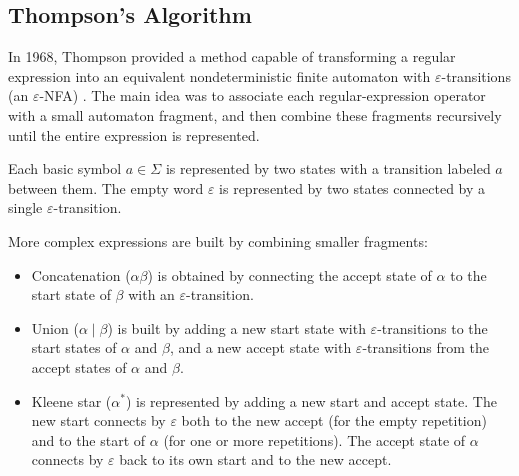 

\subsection{Thompson's Algorithm}

In 1968, Thompson provided a method capable of transforming a regular expression into an equivalent nondeterministic finite automaton with $\varepsilon$-transitions (an $\varepsilon$-NFA) \cite{thompson_re2nfa}. The main idea was to associate each regular-expression operator with a small automaton fragment, and then combine these fragments recursively until the entire expression is represented.

Each basic symbol $a \in \Sigma$ is represented by two states with a transition labeled $a$ between them. The empty word $\varepsilon$ is represented by two states connected by a single $\varepsilon$-transition.

More complex expressions are built by combining smaller fragments:
\begin{itemize}
	\item Concatenation ($\alpha\beta$) is obtained by connecting the accept state of $\alpha$ to the start state of $\beta$ with an $\varepsilon$-transition.
	\item Union ($\alpha \mid \beta$) is built by adding a new start state with $\varepsilon$-transitions to the start states of $\alpha$ and $\beta$, and a new accept state with $\varepsilon$-transitions from the accept states of $\alpha$ and $\beta$.
	\item Kleene star ($\alpha^\ast$) is represented by adding a new start and accept state. The new start connects by $\varepsilon$ both to the new accept (for the empty repetition) and to the start of $\alpha$ (for one or more repetitions). The accept state of $\alpha$ connects by $\varepsilon$ back to its own start and to the new accept.
\end{itemize}

